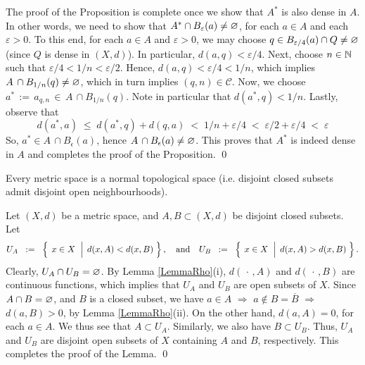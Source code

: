 \vskip 0.3cm
\noindent
The proof of the Proposition is complete once we show that $A^{*}$ is also dense in $A$.
In other words, we need to show that
$A^{*} \cap B_{\varepsilon}(a) \neq \varnothing$, for each $a \in A$ and each $\varepsilon > 0$.
To this end, for each $a \in A$ and $\varepsilon > 0$, we may choose
$q \in B_{\varepsilon / 4}(a) \cap Q \neq \varnothing$ (since $Q$ is dense in $(X,d)$).
In particular, $d(a,q) < \varepsilon / 4$.
Next, choose $n \in \mathbb{N}$ such that $\varepsilon / 4 < 1 / n < \varepsilon / 2$.
Hence, $d(a,q) < \varepsilon / 4 < 1/n$, which implies
$A \,\cap B_{1/n}(q) \neq \varnothing$, which in turn implies $(q,n) \in \mathcal{C}$.
Now, we choose $a^{*} \,:=\, a_{q,n} \,\in\, A \,\cap B_{1/n}(q)$.
Note in particular that $d(a^{*}, q) < 1 / n$.
Lastly, observe that
\begin{equation*}
d(a^*,a)
\;\leq\; d(a^*,q) + d(q,a)
\;<\; 1 / n + \varepsilon / 4
\;<\; \varepsilon / 2 + \varepsilon / 4
\;<\; \varepsilon
\end{equation*}
So, $a^* \in A\, \cap B_\epsilon(a)$, hence $A\, \cap B_\epsilon(a) \neq \varnothing$.
This proves that $A^{*}$ is indeed dense in $A$ and completes the proof of the Proposition.
\qed


\vskip 0.5cm
\begin{lemma}
\label{MetricSpacesAreNormal}
\mbox{}\vskip 0.1cm
\noindent
Every metric space is a normal topological space (i.e. disjoint closed subsets admit disjoint open neighbourhoods).
\end{lemma}
\proof
Let $(X,d)$ be a metric space, and $A, B \subset (X,d)$ be disjoint closed subsets.
Let
\begin{equation*}
U_{A}
\;\; := \;\;
	\left\{\;
	\left.
	x \overset{{\color{white}.}}{\in} X
	\;\;\right\vert\;
	d(x,A) < d(x,B)
	\;\right\},
\quad\textnormal{and}\quad
U_{B}
\;\; := \;\;
	\left\{\;
	\left.
	x \overset{{\color{white}.}}{\in} X
	\;\;\right\vert\;
	d(x,A) > d(x,B)
	\;\right\}.
\end{equation*}
Clearly, $U_{A} \cap U_{B} = \varnothing$.
By Lemma \ref{LemmaRho}(i), $d(\,\cdot\,,A)$ and $d(\,\cdot\,,B)$
are continuous functions, which implies that
$U_{A}$ and $U_{B}$ are open subsets of $X$.
Since $A \cap B = \varnothing$, and $B$ is a closed subset, we have
$a \in A$ $\Longrightarrow$ $a \notin B = \overline{B}$ $\Longrightarrow$ $d(a,B) > 0$,
by Lemma \ref{LemmaRho}(ii).
On the other hand, $d(a,A) = 0$, for each $a \in A$.
We thus see that $A \subset U_{A}$.
Similarly, we also have $B \subset U_{B}$.
Thus, $U_{A}$ and $U_{B}$ are disjoint open subsets of $X$
containing $A$ and $B$, respectively.
This completes the proof of the Lemma.
\qed


